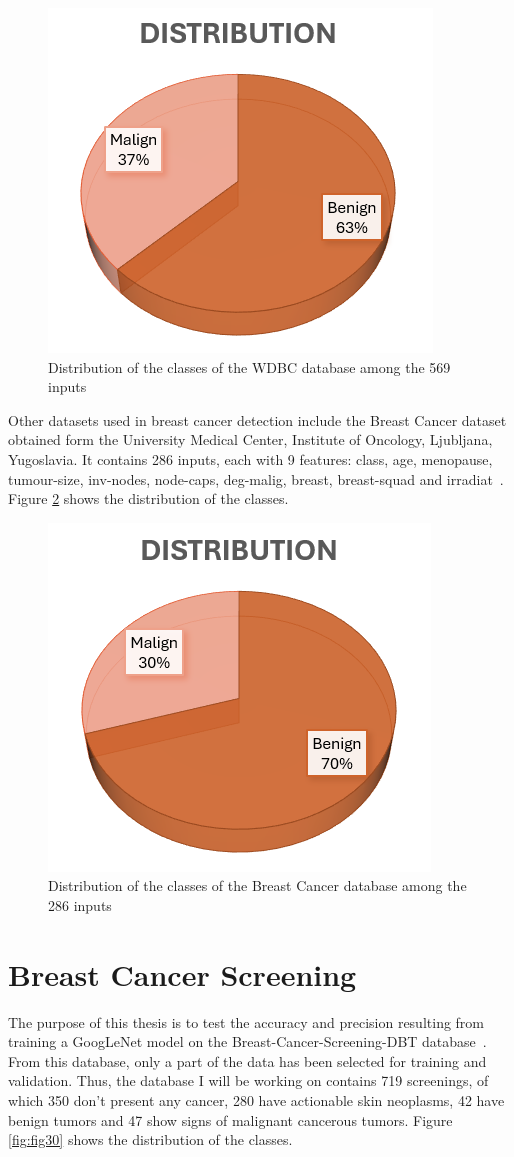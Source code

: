 \begin{figure}[ht!]
    \centering
    \includegraphics[width=0.5\linewidth]{figures/Figure34.png}
    \caption{Distribution of the classes of the WDBC database among the 569 inputs}
    \label{fig:fig28}
\end{figure}

Other datasets used in breast cancer detection include the Breast Cancer dataset obtained form the University Medical Center, Institute of Oncology, Ljubljana, Yugoslavia. It contains 286 inputs, each with 9 features: class, age, menopause, tumour-size, inv-nodes, node-caps, deg-malig, breast, breast-squad and irradiat~\cite{link10}. Figure \ref{fig:fig29} shows the distribution of the classes.
\begin{figure}[hb!]
    \centering
    \includegraphics[width=0.5\linewidth]{figures/Figure35.png}
    \caption{Distribution of the classes of the Breast Cancer database among the 286 inputs}
    \label{fig:fig29}
\end{figure}

\section{Breast Cancer Screening}

The purpose of this thesis is to test the accuracy and precision resulting from training a GoogLeNet model on the Breast-Cancer-Screening-DBT database~\cite{link4}. From this database, only a part of the data has been selected for training and validation. Thus, the database I will be working on contains 719 screenings, of which 350 don't present any cancer, 280 have actionable skin neoplasms, 42 have benign tumors and 47 show signs of malignant cancerous tumors. Figure \ref{fig:fig30} shows the distribution of the classes.

